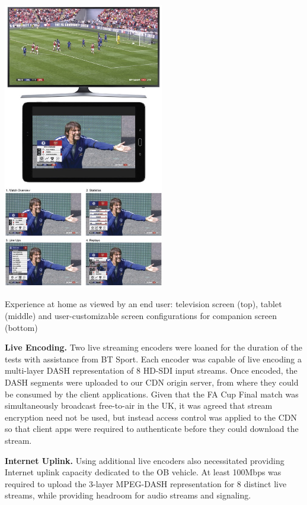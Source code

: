 \documentclass[sigchi-a, authorversion]{acmart}
\begin{document}
\begin{marginfigure}
\hspace*{-0.5cm}
    \includegraphics[width=7cm]{Figures/footballathome1.jpg}
    \caption{Experience at home as viewed by an end user: television screen (top), tablet (middle) and user-customizable screen configurations for companion screen (bottom)}
    \label{fig:homeexperience}
\end{marginfigure}

\vspace{5pt}\noindent\textbf{Live Encoding.} Two live streaming encoders were loaned for the duration
of the tests with assistance from BT Sport. Each encoder was capable of live
encoding a multi-layer DASH representation of 8 HD-SDI input streams. Once
encoded, the DASH segments were uploaded to our CDN origin server, from where
they could be consumed by the client applications. Given that the FA Cup Final
match was simultaneously broadcast free-to-air in the UK, it was agreed that
stream encryption need not be used, but instead access control was applied to
the CDN so that client apps were required to authenticate before they
could download the stream.

\vspace{5pt}\noindent\textbf{Internet Uplink.} Using additional live encoders
also necessitated providing Internet uplink capacity dedicated to the OB vehicle.
At least 100Mbps was required to upload the 3-layer MPEG-DASH representation for
8 distinct live streams, while providing headroom for audio streams and signaling.
\end{document}
